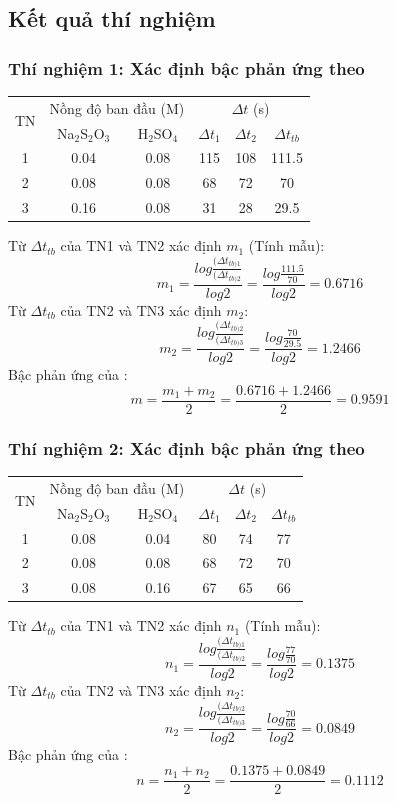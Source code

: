 \documentclass[12pt]{article}
\begin{document}
\subsection{Kết quả thí nghiệm}
\subsubsection{Thí nghiệm 1: Xác định bậc phản ứng theo }
\begin{center}
\begin{tabular}{|c|c|c|c|c|c|}
\hline
\multirow{2}{*}{TN} & \multicolumn{2}{c|}{Nồng độ ban đầu (M)} & \multicolumn{3}{c|}{$\Delta t$ (s)} \\
\cline{2-6}
 & Na$_2$S$_2$O$_3$ & H$_2$SO$_4$ & $\Delta t_1$ & $\Delta t_2$ & $\Delta t_{tb}$ \\
\hline
1 & 0.04 & 0.08 & 115 & 108 & 111.5 \\ \hline
2 & 0.08 & 0.08 & 68 & 72 & 70 \\ \hline
3 & 0.16 & 0.08 & 31 & 28 & 29.5 \\
\hline
\end{tabular}
\end{center}
Từ $\Delta t_{tb}$ của TN1 và TN2 xác định $m_1$ (Tính mẫu):
\[
m_1 = \frac{log{\frac{(\Delta t_{tb)1}}{(\Delta t_{tb)2}}}}{log 2} = \frac{log\frac{111.5}{70}}{log2} = 0.6716
\]
Từ $\Delta t_{tb}$ của TN2 và TN3 xác định $m_2$:
\[
m_2 = \frac{log{\frac{(\Delta t_{tb)2}}{(\Delta t_{tb)3}}}}{log 2} = \frac{log\frac{70}{29.5}}{log2} = 1.2466
\]
Bậc phản ứng của :
\[
m = \frac{m_1 + m_2}{2} = \frac{0.6716 + 1.2466}{2} = 0.9591
\]
\subsubsection{Thí nghiệm 2: Xác định bậc phản ứng theo }
\begin{center}
\begin{tabular}{|c|c|c|c|c|c|}
\hline
\multirow{2}{*}{TN} & \multicolumn{2}{c|}{Nồng độ ban đầu (M)} & \multicolumn{3}{c|}{$\Delta t$ (s)} \\
\cline{2-6}
 & Na$_2$S$_2$O$_3$ & H$_2$SO$_4$ & $\Delta t_1$ & $\Delta t_2$ & $\Delta t_{tb}$ \\
\hline
1 & 0.08 & 0.04 & 80 & 74 & 77 \\ \hline
2 & 0.08 & 0.08 & 68 & 72 & 70 \\ \hline
3 & 0.08 & 0.16 & 67 & 65 & 66 \\
\hline
\end{tabular}
\end{center}
Từ $\Delta t_{tb}$ của TN1 và TN2 xác định $n_1$ (Tính mẫu):
\[
n_1 = \frac{log{\frac{(\Delta t_{tb)1}}{(\Delta t_{tb)2}}}}{log 2} = \frac{log\frac{77}{70}}{log2} = 0.1375
\]
Từ $\Delta t_{tb}$ của TN2 và TN3 xác định $n_2$:
\[
n_2 = \frac{log{\frac{(\Delta t_{tb)2}}{(\Delta t_{tb)3}}}}{log 2} = \frac{log\frac{70}{66}}{log2} = 0.0849
\]
Bậc phản ứng của :
\[
n = \frac{n_1 +n_2}{2} = \frac{0.1375 + 0.0849}{2} = 0.1112
\]
\end{document}
